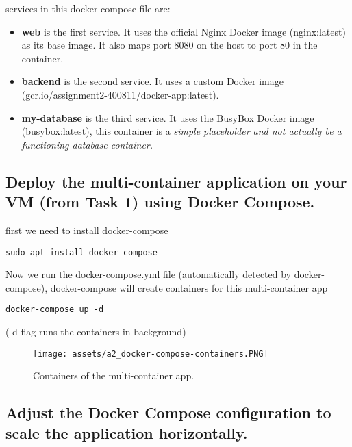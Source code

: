 \documentclass[12pt]{article}
\begin{document}
services in this docker-compose file are:

\begin{itemize}[noitemsep]
  \item \textbf{web} is the first service. It uses the official Nginx Docker image (nginx:latest) as its base image. It also maps port 8080 on the host to port 80 in the container.
  \item \textbf{backend} is the second service. It uses a custom Docker image (gcr.io/assignment2-400811/docker-app:latest). 
  \item \textbf{my-database} is the third service. It uses the BusyBox Docker image (busybox:latest), this container is a \textit{simple placeholder and not actually be a functioning database container.}
\end{itemize}

\clearpage

\subsection{Deploy the multi-container application on your VM (from Task 1) using Docker Compose.}

first we need to install docker-compose

\begin{listing}[htbp]
\begin{verbatim}
sudo apt install docker-compose
\end{verbatim}
\end{listing}

Now we run the docker-compose.yml file (automatically detected by docker-compose), docker-compose will create containers for this multi-container app

\begin{listing}[htbp]
\begin{verbatim}
docker-compose up -d
\end{verbatim}
\end{listing}
(-d flag runs the containers in background)

\begin{figure}[htbp]
    \centering
    \texttt{[image: assets/a2\_docker-compose-containers.PNG]}
    \caption{Containers of the multi-container app.}
    \label{fig:logo}
\end{figure}

\subsection{ Adjust the Docker Compose configuration to scale the application horizontally.}
\end{document}
